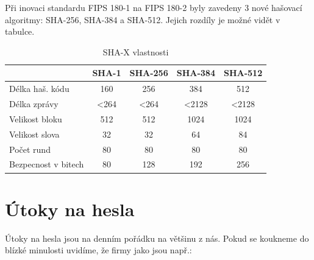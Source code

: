 
Při inovaci standardu FIPS 180-1 na FIPS 180-2  byly zavedeny 3 nové hašovací algoritmy: SHA-256, SHA-384 a SHA-512. Jejich rozdíly je možné vidět v tabulce. 


\begin{table}[!ht]
  \begin{center}
	\caption{SHA-X vlastnosti}
    \label{tab:SHA-X}
    \begin{tabular}{|l|c|c|c|c|} 
    	  \hline
      \textbf{} & \textbf{SHA-1} & \textbf{SHA-256} & \textbf{SHA-384} & \textbf{SHA-512}\\
      \hline
	  Délka haš. kódu 		& 160  & 256  & 384   & 512\\
	  Délka zprávy 			& <264 & <264 & <2128 & <2128\\
	  Velikost bloku 		& 512  & 512  & 1024  & 1024\\
	  Velikost slova 		& 32   & 32   & 64    & 84\\
	  Počet rund 			& 80   & 80   & 80    & 80\\
	  Bezpecnost v bitech 	& 80   & 128  & 192   & 256\\
      \hline
    \end{tabular}
  \end{center}
\end{table}

\section{Útoky na hesla}

Útoky na hesla jsou na denním pořádku na většinu z nás. Pokud se koukneme do blízké minulosti uvidíme, že firmy jako jsou např.: 

